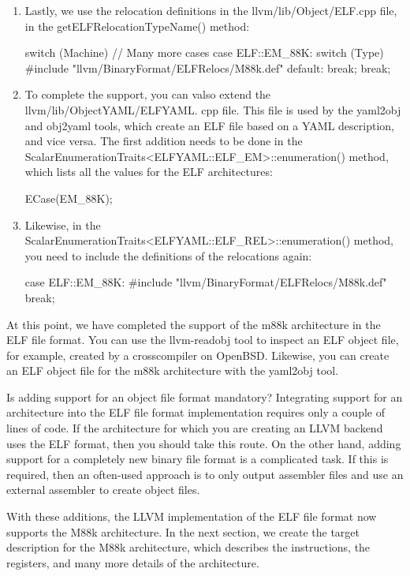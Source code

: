 \begin{enumerate}
\item
Lastly, we use the relocation definitions in the llvm/lib/Object/ELF.cpp file, in the getELFRelocationTypeName() method:

\begin{cpp}
switch (Machine) {
    // Many more cases
    case ELF::EM_88K:
    switch (Type) {
        #include "llvm/BinaryFormat/ELFRelocs/M88k.def"
        default:
        break;
    }
    break;
}
\end{cpp}

\item
To complete the support, you can valso extend the llvm/lib/ObjectYAML/ELFYAML. cpp file. This file is used by the yaml2obj and obj2yaml tools, which create an ELF file based on a YAML description, and vice versa. The first addition needs to be done in the ScalarEnumerationTraits<ELFYAML::ELF\_EM>::enumeration() method, which lists all the values for the ELF architectures:

\begin{cpp}
ECase(EM_88K);
\end{cpp}

\item
Likewise, in the ScalarEnumerationTraits<ELFYAML::ELF\_REL>::enumeration() method, you need to include the definitions of the relocations again:

\begin{cpp}
    case ELF::EM_88K:
#include "llvm/BinaryFormat/ELFRelocs/M88k.def"
    break;
\end{cpp}
\end{enumerate}

At this point, we have completed the support of the m88k architecture in the ELF file format. You can use the llvm-readobj tool to inspect an ELF object file, for example, created by a crosscompiler on OpenBSD. Likewise, you can create an ELF object file for the m88k architecture with the yaml2obj tool.

\begin{myNotic}{Is adding support for an object file format mandatory?}
Integrating support for an architecture into the ELF file format implementation requires only a couple of lines of code. If the architecture for which you are creating an LLVM backend uses the ELF format, then you should take this route. On the other hand, adding support for a completely new binary file format is a complicated task. If this is required, then an often-used approach is to only output assembler files and use an external assembler to create object files.
\end{myNotic}

With these additions, the LLVM implementation of the ELF file format now supports the M88k architecture. In the next section, we create the target description for the M88k architecture, which describes the instructions, the registers, and many more details of the architecture.


















